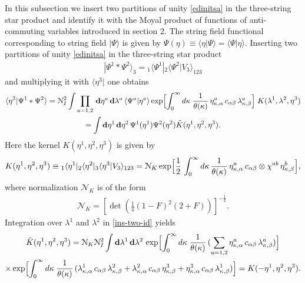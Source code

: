 \documentclass[a4paper,12pt]{article}
\newcommand{\Nc}{\mathcal{N}}
\begin{document}
In this subsection we insert two partitions of unity
\eqref{edinitsa} in the three-string
star product and identify it with the Moyal product
of functions of anti-commuting variables introduced in section 2.
The string field
functional corresponding to string
field $|\Psi\rangle$
is given by
$\Psi(\eta)\equiv\langle\eta|\Psi\rangle=\langle\Psi|\eta\rangle$.
Inserting two partitions of unity
\eqref{edinitsa} in the three-string star product
\begin{gather}
|\Psi^{1}*\Psi^{2}\rangle_{3}
={}_{1}\langle\Psi^1|{}_{2}\langle\Psi^{2}|V_{3}\rangle_{123}
\end{gather}
and multiplying it with $\langle\eta^3|$ one obtains
\begin{multline}
\langle \eta^{3}|\Psi^{1}*\Psi^{2}\rangle=
\Nc_{I}^2
\int
\prod_{a=1,2}\,
\mathbf{d}\eta^{a}\,\mathbf{d}\lambda^{a}\,
\langle\Psi^{a}|\eta^{a}\rangle
\exp\Bigl[\int_{0}^{\infty}d\kappa\;
\frac{1}{\theta(\kappa)}\,\eta^{a}_{\kappa,\alpha}\,
c_{\alpha\beta}\,\lambda^{a}_{\kappa,\beta}\Bigr]\;
K(\lambda^1,\lambda^2,\eta^3)\\
=\int\mathbf{d}\eta^{1}\,\mathbf{d}\eta^{2}\,
\Psi^{1}(\eta^{1})\Psi^{2}(\eta^{2})
\tilde{K}(\eta^1,\eta^2,\eta^3).
\label{ins-two-id}
\end{multline}
Here the kernel $K(\eta^1,\eta^2,\eta^3)$ is given by
\begin{gather}
K(\eta^1,\eta^2,\eta^3)
\equiv
{}_{1}\langle \eta^1|{}_{2}\langle \eta^2|{}_{3}\langle \eta^3|
V_{3}\rangle_{123}
=\Nc_{K}\exp\Bigl[\frac12\,\int_{0}^{\infty}d\kappa\,
\frac{1}{\theta(\kappa)}\,\eta^a_{\kappa,\alpha}\,
c_{\alpha\beta}\otimes\chi^{ab}\,\eta^b_{\kappa,\beta}\Bigr],
\label{kernel-eta}
\end{gather}
where normalization $\Nc_{K}$ is of the form
\begin{gather}
\Nc_{K}=\left[\det\left(
\tfrac14(1-F)^{2}(2+F)\right)\right]^{-\tfrac12}.
\end{gather}
Integration over $\lambda^1$ and $\lambda^2$ in \eqref{ins-two-id} yields
\begin{multline}
\tilde{K}(\eta^1,\eta^2,\eta^3)=
\Nc_{K}\Nc_{I}^2\int
\mathbf{d}\lambda^{1}\,
\mathbf{d}\lambda^{2}\,
\exp\Bigl[\int_{0}^{\infty}d\kappa\;
\frac{1}{\theta(\kappa)}\,
(\sum_{a=1,2}\eta^{a}_{\kappa,\alpha}\,c_{\alpha\beta}\,
\lambda^{a}_{\kappa,\beta})\Bigr]\\
\times
\exp\Bigl[\int_{0}^{\infty}d\kappa\;
\frac{1}{\theta(\kappa)}\,
(\lambda^1_{\kappa,\alpha}\,c_{\alpha\beta}\,\lambda^2_{\kappa,\beta}
+\lambda^2_{\kappa,\alpha}\,c_{\alpha\beta}\,\eta^3_{\kappa,\beta}
+\eta^3_{\kappa,\alpha}\,c_{\alpha\beta}\,\lambda^1_{\kappa,\beta})\Bigr]
=K(-\eta^1,\eta^2,\eta^3).
\label{kernel-tilde}
\end{multline}
\end{document}

